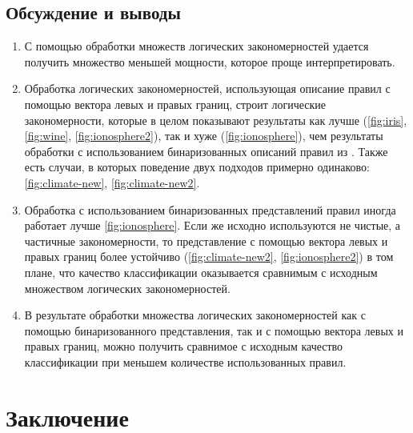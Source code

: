 \documentclass[12pt]{article}
\begin{document}
\subsection{Обсуждение и выводы}


\begin{enumerate}
  \item С помощью обработки множеств логических закономерностей
    удается получить множество меньшей мощности, которое проще
    интерпретировать.
  \item Обработка логических закономерностей, использующая описание
    правил с помощью вектора левых и правых границ, строит логические
    закономерности, которые в целом показывают результаты как лучше
    (\ref{fig:iris}, \ref{fig:wine}, \ref{fig:ionosphere2}), так и
    хуже (\ref{fig:ionosphere}), чем результаты обработки с
    использованием бинаризованных описаний правил из
    \cite{novikov15}. Также есть случаи, в которых поведение двух
    подходов примерно одинаково: \ref{fig:climate-new},
    \ref{fig:climate-new2}.
  \item Обработка с использованием бинаризованных представлений правил
    иногда работает лучше \ref{fig:ionosphere}. Если же исходно
    используются не чистые, а частичные закономерности, то
    представление с помощью вектора левых и правых границ более
    устойчиво (\ref{fig:climate-new2}, \ref{fig:ionosphere2}) в том
    плане, что качество классификации оказывается сравнимым с исходным
    множеством логических закономерностей.
  \item В результате обработки множества логических закономерностей
    как с помощью бинаризованного представления, так и с помощью
    вектора левых и правых границ, можно получить сравнимое с исходным
    качество классификации при меньшем количестве использованных
    правил.
\end{enumerate}

\section{Заключение}
\end{document}
